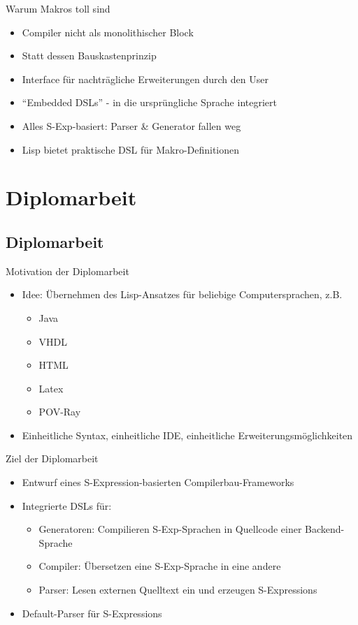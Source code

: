 \documentclass{beamer}
\newcommand{\pfeil}{\item[$\Rightarrow$]}
\begin{document}
\begin{frame}{Warum Makros toll sind}
  \begin{itemize}
  \item Compiler nicht als monolithischer Block
  \item Statt dessen Bauskastenprinzip
  \item Interface für nachträgliche Erweiterungen durch den User
  \item ``Embedded DSLs'' - in die ursprüngliche Sprache integriert
  \item Alles S-Exp-basiert: Parser \& Generator fallen weg
  \item Lisp bietet praktische DSL für Makro-Definitionen 
  \end{itemize}
\end{frame}

\section{Diplomarbeit}
\subsection{Diplomarbeit}

\begin{frame}{Motivation der Diplomarbeit}
  \begin{itemize}
  \item Idee: Übernehmen des Lisp-Ansatzes für beliebige Computersprachen, z.B.
    \begin{itemize}
    \item Java
    \item VHDL
    \item HTML
    \item Latex
    \item POV-Ray
    \end{itemize}
  \pfeil Einheitliche Syntax, einheitliche IDE, einheitliche Erweiterungsmöglichkeiten
\end{itemize}
\end{frame}

\begin{frame}{Ziel der Diplomarbeit}
  \begin{itemize}
  \item Entwurf eines S-Expression-basierten Compilerbau-Frameworks
  \item Integrierte DSLs für:
    \begin{itemize}
    \item Generatoren: Compilieren S-Exp-Sprachen in Quellcode einer Backend-Sprache
    \item Compiler: Übersetzen eine S-Exp-Sprache in eine andere
    \item Parser: Lesen externen Quelltext ein und erzeugen S-Expressions
    \end{itemize}
  \item Default-Parser für S-Expressions
  \end{itemize}
\end{frame}
\end{document}
